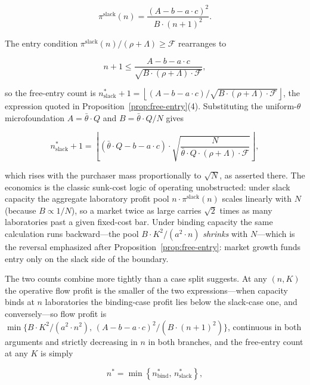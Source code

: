 \documentclass[11pt]{article}
\begin{document}
\begin{equation}\pi^{\mathrm{slack}}(n)=\frac{(A-b-a\cdot c)^{2}}{B\cdot(n+1)^{2}}.\end{equation}

The entry condition $\pi^{\mathrm{slack}}(n)/(\rho+\Lambda)\geq\mathcal F$ rearranges to

\begin{equation}n+1\leq\frac{A-b-a\cdot c}{\sqrt{B\cdot(\rho+\Lambda)\cdot\mathcal F}},\end{equation}

so the free-entry count is $n^{*}_{\mathrm{slack}}+1=\left\lfloor(A-b-a\cdot c)/\sqrt{B\cdot(\rho+\Lambda)\cdot\mathcal F}\right\rfloor$, the expression quoted in Proposition~\ref{prop:free-entry}(4). Substituting the uniform-$\theta$ microfoundation $A=\bar\theta\cdot Q$ and $B=\bar\theta\cdot Q/N$ gives

\begin{equation}n^{*}_{\mathrm{slack}}+1=\left\lfloor\left(\bar\theta\cdot Q-b-a\cdot c\right)\cdot\sqrt{\frac{N}{\bar\theta\cdot Q\cdot(\rho+\Lambda)\cdot\mathcal F}}\right\rfloor,\end{equation}

which rises with the purchaser mass proportionally to $\sqrt N$, as asserted there. The economics is the classic sunk-cost logic of \citet{sutton1991} operating unobstructed: under slack capacity the aggregate laboratory profit pool $n\cdot\pi^{\mathrm{slack}}(n)$ scales linearly with $N$ (because $B\propto1/N$), so a market twice as large carries $\sqrt2$ times as many laboratories past a given fixed-cost bar. Under binding capacity the same calculation runs backward---the pool $B\cdot K^{2}/(a^{2}\cdot n)$ \emph{shrinks} with $N$---which is the reversal emphasized after Proposition~\ref{prop:free-entry}: market growth funds entry only on the slack side of the boundary.

The two counts combine more tightly than a case split suggests. At any $(n,K)$ the operative flow profit is the smaller of the two expressions---when capacity binds at $n$ laboratories the binding-case profit lies below the slack-case one, and conversely---so flow profit is $\min\{B\cdot K^{2}/(a^{2}\cdot n^{2}),\,(A-b-a\cdot c)^{2}/(B\cdot(n+1)^{2})\}$, continuous in both arguments and strictly decreasing in $n$ in both branches, and the free-entry count at any $K$ is simply

\begin{equation}n^{*}=\min\left\{n^{*}_{\mathrm{bind}},\,n^{*}_{\mathrm{slack}}\right\},\end{equation}
\end{document}
